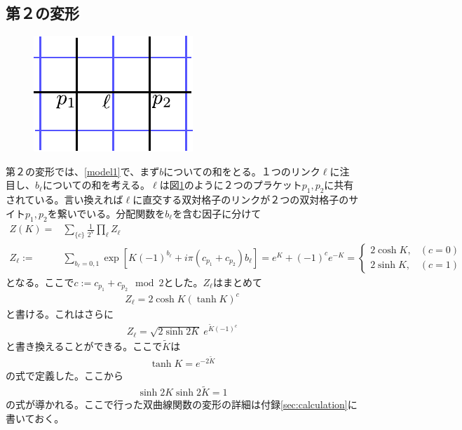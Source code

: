 \documentclass[a4paper,12pt,dvipdfmx]{jlreq}
\newcommand{\Kt}{\widetilde{K}}
\begin{document}
\subsection{第２の変形}
\label{sec:second}
\begin{figure}[htbp]
  \centering
  \includegraphics{link_plaquette.pdf}
  \caption{{}}
  \label{fig:link_plaquette}
\end{figure}

第２の変形では、\eqref{model1}で、まず$b$についての和をとる。１つのリンク$\ell$に注目し、$b_{\ell}$についての和を考える。$\ell$は図\ref{fig:link_plaquette}のように２つのプラケット$p_1,p_2$に共有されている。言い換えれば$\ell$に直交する双対格子のリンクが２つの双対格子のサイト$p_1,p_2$を繋いでいる。分配関数を$b_{\ell}$を含む因子に分けて
\begin{align}
  Z(K)=&\sum_{\{c\}}\frac{1}{2^V}\prod_{\ell}Z_{\ell}\\
  Z_{\ell}:=&\sum_{b_{\ell}=0,1}\exp\left[
    K(-1)^{b_{\ell}}+i\pi (c_{p_1}+c_{p_2})b_{\ell}
  \right]
  =e^{K}+(-1)^{c}e^{-K}
  =
  \begin{cases}
    2\cosh K, & (c=0)\\
    2\sinh K, & (c=1)
  \end{cases}
\end{align}
となる。ここで$c:=c_{p_1}+c_{p_2} \mod 2$とした。$Z_{\ell}$はまとめて
\begin{align}
  Z_{\ell}=2\cosh K (\tanh K)^{c}
\end{align}
と書ける。これはさらに\begin{align}
  Z_{\ell}=\sqrt{2\sinh 2K}\ e^{\Kt(-1)^c}\label{Zelltemp}
\end{align}
と書き換えることができる。ここで$\Kt$は
\begin{align}
  \tanh K = e^{-2\Kt}
\end{align}
の式で定義した。ここから
\begin{align}
  \sinh 2 K \sinh 2\Kt =1 \label{dualK}
\end{align}
の式が導かれる。ここで行った双曲線関数の変形の詳細は付録\ref{sec:calculation}に書いておく。
\end{document}
